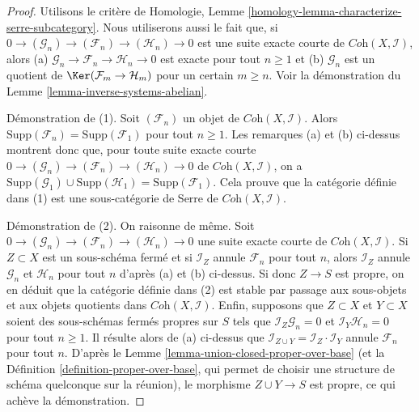 \begin{proof}
Utilisons le critère de
Homologie, Lemme \ref{homology-lemma-characterize-serre-subcategory}.
Nous utiliserons aussi le fait que, si
$0 \to (\mathcal{G}_n) \to (\mathcal{F}_n) \to (\mathcal{H}_n) \to 0$
est une suite exacte courte de $\textit{Coh}(X, \mathcal{I})$, alors
(a) $\mathcal{G}_n \to \mathcal{F}_n \to \mathcal{H}_n \to 0$
est exacte pour tout $n \geq 1$ et
(b) $\mathcal{G}_n$ est un quotient de $\Ker(\mathcal{F}_m \to \mathcal{H}_m)$
pour un certain $m \geq n$. Voir la démonstration du Lemme \ref{lemma-inverse-systems-abelian}.

\medskip\noindent
Démonstration de (1). Soit $(\mathcal{F}_n)$ un objet de
$\textit{Coh}(X, \mathcal{I})$. Alors
$\text{Supp}(\mathcal{F}_n) = \text{Supp}(\mathcal{F}_1)$ pour tout $n \geq 1$.
Les remarques (a) et (b) ci-dessus montrent donc que,
pour toute suite exacte courte
$0 \to (\mathcal{G}_n) \to (\mathcal{F}_n) \to (\mathcal{H}_n) \to 0$
de $\textit{Coh}(X, \mathcal{I})$, on a
$\text{Supp}(\mathcal{G}_1) \cup \text{Supp}(\mathcal{H}_1) =
\text{Supp}(\mathcal{F}_1)$.
Cela prouve que la catégorie définie dans (1)
est une sous-catégorie de Serre de $\textit{Coh}(X, \mathcal{I})$.

\medskip\noindent
Démonstration de (2). On raisonne de même. Soit
$0 \to (\mathcal{G}_n) \to (\mathcal{F}_n) \to (\mathcal{H}_n) \to 0$
une suite exacte courte de $\textit{Coh}(X, \mathcal{I})$.
Si $Z \subset X$ est un sous-schéma fermé et si $\mathcal{I}_Z$
annule $\mathcal{F}_n$ pour tout $n$, alors
$\mathcal{I}_Z$ annule $\mathcal{G}_n$ et $\mathcal{H}_n$
pour tout $n$ d'après (a) et (b) ci-dessus.
Si donc $Z \to S$ est propre, on en déduit que la catégorie
définie dans (2) est stable par passage aux sous-objets et aux objets quotients
dans $\textit{Coh}(X, \mathcal{I})$.
Enfin, supposons que $Z \subset X$ et $Y \subset X$ soient
des sous-schémas fermés propres sur $S$ tels que
$\mathcal{I}_Z \mathcal{G}_n = 0$ et
$\mathcal{I}_Y \mathcal{H}_n = 0$ pour tout $n \geq 1$.
Il résulte alors de (a) ci-dessus que
$\mathcal{I}_{Z \cup Y} = \mathcal{I}_Z \cdot \mathcal{I}_Y$
annule $\mathcal{F}_n$ pour tout $n$.
D'après le Lemme \ref{lemma-union-closed-proper-over-base}
(et la Définition \ref{definition-proper-over-base}, qui
permet de choisir une structure de schéma quelconque sur la réunion),
le morphisme $Z \cup Y \to S$ est propre, ce qui achève la démonstration.
\end{proof}








